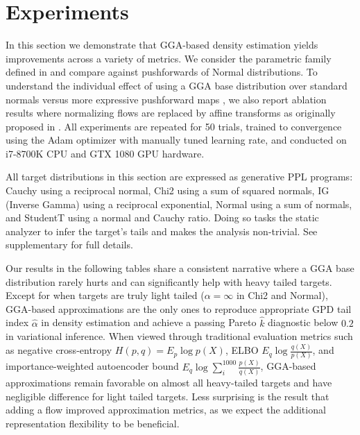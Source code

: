 \documentclass[../thesis.tex]{subfiles}
\begin{document}
\section{Experiments}\label{sec:hta:experiments}

In this section we demonstrate that GGA-based density estimation yields improvements across a variety of metrics.
We consider the parametric family defined in  and compare against pushforwards of Normal distributions. To understand the individual
effect of using a GGA base distribution over standard normals versus more expressive pushforward maps \citep{durkan2019neural}, we also report ablation results where
normalizing flows are replaced by affine transforms as originally
proposed in \citep{kucukelbir2017automatic}. All experiments are repeated for 50 trials, trained to convergence using the Adam optimizer with manually tuned learning rate,
and conducted on i7-8700K CPU and GTX 1080 GPU hardware.

All target distributions in this section are expressed as generative PPL programs:
Cauchy using a reciprocal normal, Chi2 using a sum of squared normals, IG (Inverse Gamma)
using a reciprocal exponential, Normal using a sum of normals, and StudentT using a
normal and Cauchy ratio. Doing so tasks the static analyzer to infer the target's tails and makes the analysis non-trivial.
See supplementary for full details.

Our results in the following tables share a consistent narrative where a GGA base
distribution rarely hurts and can significantly help with heavy tailed targets.
Except for when targets are truly light tailed ($\alpha=\infty$ in Chi2 and Normal),
GGA-based approximations are the only ones to reproduce appropriate GPD tail index $\hat\alpha$ in density estimation and achieve a passing Pareto $\hat{k}$ diagnostic
\citep{yao2018yes} below $0.2$ in variational inference. When viewed through traditional
evaluation metrics such as negative cross-entropy $H(p,q) = E_p \log p(X)$,
ELBO $E_q \log \frac{q(X)}{p(X)}$,
and importance-weighted autoencoder bound \citep{burda2015importance} $E_q \log \sum_i^{1000} \frac{p(X)}{q(X)}$, GGA-based approximations remain favorable on almost all heavy-tailed
targets and have negligible difference for light tailed targets. Less surprising is the result that adding a flow improved approximation metrics, as we expect the additional representation flexibility to be beneficial.

\end{document}
